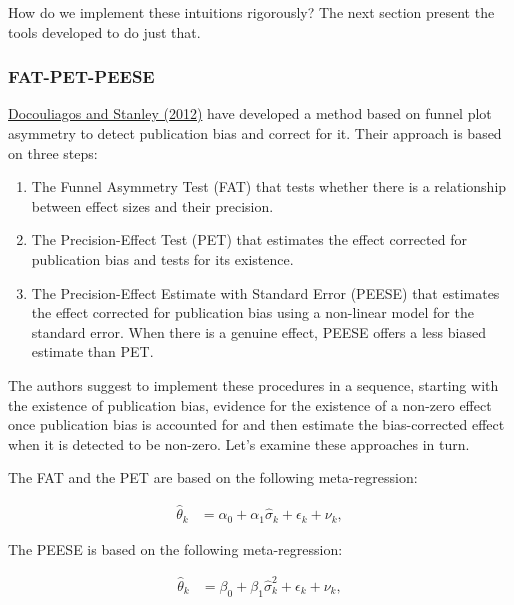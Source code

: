 \documentclass[]{book}
\providecommand{\tightlist}{%
  \setlength{\itemsep}{0pt}\setlength{\parskip}{0pt}}
\theoremstyle{definition}
\theoremstyle{definition}
\theoremstyle{definition}
\theoremstyle{remark}
\begin{document}
How do we implement these intuitions rigorously?
The next section present the tools developed to do just that.

\hypertarget{fat-pet-peese}{%
\subsubsection{FAT-PET-PEESE}\label{fat-pet-peese}}

\href{https://books.google.fr/books?hl=fr\&lr=\&id=jSQEdEsL7VoC\&oi=fnd\&pg=PP2\&dq=doucouliagos+and+stanley+meta-regression+analysis+in+economics\&ots=jTXmePff2F\&sig=Dm5EOhOroc5K8EUYvqK4fvJrPs8\#v=onepage\&q=doucouliagos\%20and\%20stanley\%20meta-regression\%20analysis\%20in\%20economics\&f=false}{Docouliagos and Stanley (2012)} have developed a method based on funnel plot asymmetry to detect publication bias and correct for it.
Their approach is based on three steps:

\begin{enumerate}
\def\labelenumi{\arabic{enumi}.}
\tightlist
\item
  The Funnel Asymmetry Test (FAT) that tests whether there is a relationship between effect sizes and their precision.
\item
  The Precision-Effect Test (PET) that estimates the effect corrected for publication bias and tests for its existence.
\item
  The Precision-Effect Estimate with Standard Error (PEESE) that estimates the effect corrected for publication bias using a non-linear model for the standard error.
  When there is a genuine effect, PEESE offers a less biased estimate than PET.
\end{enumerate}

The authors suggest to implement these procedures in a sequence, starting with the existence of publication bias, evidence for the existence of a non-zero effect once publication bias is accounted for and then estimate the bias-corrected effect when it is detected to be non-zero.
Let's examine these approaches in turn.

The FAT and the PET are based on the following meta-regression:

\begin{align*}
\hat{\theta}_k & = \alpha_0 + \alpha_1\hat{\sigma}_k  + \epsilon_k + \nu_k,
\end{align*}

The PEESE is based on the following meta-regression:

\begin{align*}
\hat{\theta}_k & = \beta_0 + \beta_1\hat{\sigma}^2_k  + \epsilon_k + \nu_k,
\end{align*}
\end{document}
